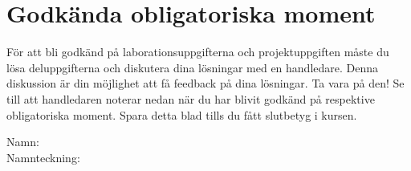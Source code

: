 \newpage

\section*{Godkända obligatoriska moment}

\vspace{0.5em}\noindent
För att bli godkänd på laborationsuppgifterna och projektuppgiften måste du lösa deluppgifterna och diskutera dina lösningar med en handledare. Denna diskussion är din möjlighet att få feedback på dina lösningar. Ta vara på den!
Se till att handledaren noterar nedan när du har blivit godkänd på respektive obligatoriska moment. Spara detta blad tills du fått slutbetyg i kursen.


\vspace{1.0em}\noindent Namn: \dotfill\\

\vspace{0.25em}\noindent Namnteckning: \dotfill\\

\newcommand{\LabRow}[1]{\\[-1.1em] \hyperref[section:lab:#1]{\texttt{#1}} & \dotfill &  \dotfill  \\[0.5em]}  %


